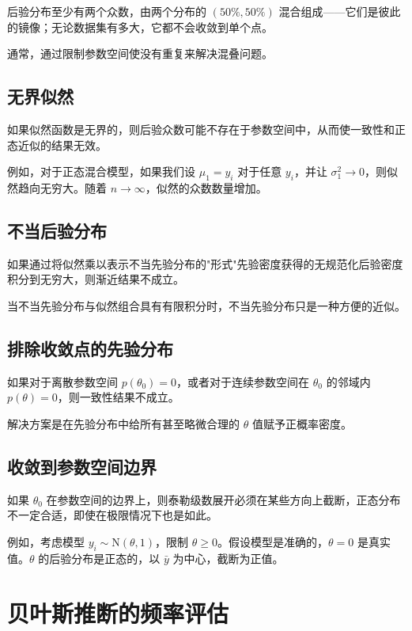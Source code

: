 后验分布至少有两个众数，由两个分布的 $(50\%, 50\%)$ 混合组成——它们是彼此的镜像；无论数据集有多大，它都不会收敛到单个点。

通常，通过限制参数空间使没有重复来解决混叠问题。

\subsection{无界似然}

如果似然函数是无界的，则后验众数可能不存在于参数空间中，从而使一致性和正态近似的结果无效。

例如，对于正态混合模型，如果我们设 $\mu_1 = y_i$ 对于任意 $y_i$，并让 $\sigma_1^2 \to 0$，则似然趋向无穷大。随着 $n \to \infty$，似然的众数数量增加。

\subsection{不当后验分布}

如果通过将似然乘以表示不当先验分布的"形式"先验密度获得的无规范化后验密度积分到无穷大，则渐近结果不成立。

当不当先验分布与似然组合具有有限积分时，不当先验分布只是一种方便的近似。

\subsection{排除收敛点的先验分布}

如果对于离散参数空间 $p(\theta_0) = 0$，或者对于连续参数空间在 $\theta_0$ 的邻域内 $p(\theta) = 0$，则一致性结果不成立。

解决方案是在先验分布中给所有甚至略微合理的 $\theta$ 值赋予正概率密度。

\subsection{收敛到参数空间边界}

如果 $\theta_0$ 在参数空间的边界上，则泰勒级数展开必须在某些方向上截断，正态分布不一定合适，即使在极限情况下也是如此。

例如，考虑模型 $y_i \sim \mathrm{N}(\theta, 1)$，限制 $\theta \geq 0$。假设模型是准确的，$\theta = 0$ 是真实值。$\theta$ 的后验分布是正态的，以 $\bar{y}$ 为中心，截断为正值。

\section{贝叶斯推断的频率评估}

